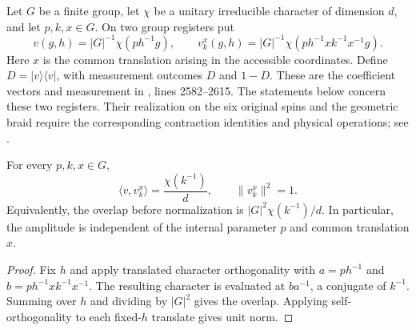 \begin{definition}
    \label{def:peps_regular_charge_pair_interference}
    \leanok
    Let $G$ be a finite group, let $\chi$ be a unitary irreducible character
    of dimension $d$, and let $p,k,x\in G$. On two group registers put
    \[
        v(g,h)=|G|^{-1}\chi(ph^{-1}g),\qquad
        v_k^x(g,h)=|G|^{-1}\chi(ph^{-1}xk^{-1}x^{-1}g).
    \]
    Here $x$ is the common translation arising in the accessible coordinates.
    Define $D=|v\rangle\langle v|$, with measurement outcomes $D$ and $1-D$.
    These are the coefficient vectors and measurement in
    \cite[interference calculation]{Schuch2010PEPS}, lines 2582--2615.
    The statements below concern these two registers. Their realization on
    the six original spins and the geometric braid require the corresponding
    contraction identities and physical operations; see
    \cite{gap:rmp_peps_quantum_double_g_isometry}.
\end{definition}

\begin{lemma}
    \label{thm:peps_regular_charge_pair_interference_overlap}
    \leanok
    For every $p,k,x\in G$,
    \[
        \langle v,v_k^x\rangle=\frac{\chi(k^{-1})}{d},
        \qquad \|v_k^x\|^2=1.
    \]
    Equivalently, the overlap before normalization is
    $|G|^2\chi(k^{-1})/d$. In particular, the amplitude is independent of
    the internal parameter $p$ and common translation $x$.
\end{lemma}

\begin{proof}\leanok
    Fix $h$ and apply translated character orthogonality with
    $a=ph^{-1}$ and $b=ph^{-1}xk^{-1}x^{-1}$. The resulting character is
    evaluated at $ba^{-1}$, a conjugate of $k^{-1}$. Summing over $h$ and
    dividing by $|G|^2$ gives the overlap. Applying self-orthogonality to
    each fixed-$h$ translate gives unit norm.
\end{proof}

